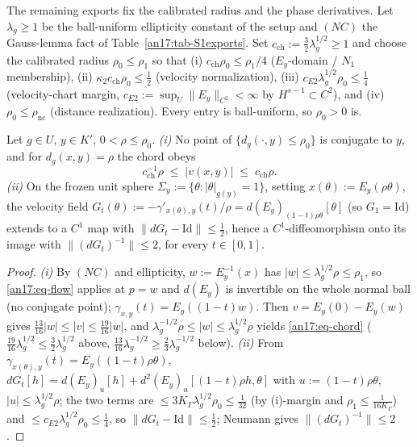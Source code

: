 The remaining exports fix the calibrated radius and the phase derivatives. Let
$\lambda_g\ge1$ be the ball-uniform ellipticity constant of the setup and $(NC)$
the Gauss-lemma fact of Table~\ref{an17:tab-S1exports}. Set
$c_{\mathrm{ch}}:=\tfrac32\lambda_g^{1/2}\ge1$ and choose the calibrated radius
$\rho_0\le\rho_1$ so that (i) $c_{\mathrm{ch}}\rho_0\le\rho_1/4$
($E_y$-domain / $N_1$ membership), (ii) $\kappa_2c_{\mathrm{ch}}\rho_0\le\tfrac12$
(velocity normalization), (iii) $c_{E2}\lambda_g^{1/2}\rho_0\le\tfrac14$
(velocity-chart margin, $c_{E2}:=\sup_U\|E_y\|_{C^2}<\infty$ by $H^{s-1}\subset
C^2$), and (iv) $\rho_0\le\rho_{\mathrm{nc}}$ (distance realization). Every entry
is ball-uniform, so $\rho_0>0$ is.

\begin{lemma}
\label{an17:lem-R4}%
\label{an17:R4}%
Let $g\in U$, $y\in K'$, $0<\rho\le\rho_0$. \emph{(i)} No point of
$\{d_g(\cdot,y)\le\rho_0\}$ is conjugate to $y$, and for $d_g(x,y)=\rho$ the
chord obeys
\begin{equation}\label{an17:eq-chord}
 c_{\mathrm{ch}}^{-1}\rho\;\le\;|v(x,y)|\;\le\;c_{\mathrm{ch}}\rho .
\end{equation}
\emph{(ii)} On the frozen unit sphere $\Sigma_y:=\{\theta:|\theta|_{g(y)}=1\}$,
setting $x(\theta):=E_y(\rho\theta)$, the velocity field $G_t(\theta):=-\gamma'_{
x(\theta),y}(t)/\rho=d(E_y)_{(1-t)\rho\theta}[\theta]$ (so $G_1=\mathrm{Id}$)
extends to a $C^1$ map with $\|dG_t-\mathrm{Id}\|\le\tfrac12$, hence a
$C^1$-diffeomorphism onto its image with $\|(dG_t)^{-1}\|\le2$, for every
$t\in[0,1]$.
\end{lemma}
\begin{proof}
\emph{(i)} By $(NC)$ and ellipticity, $w:=E_y^{-1}(x)$ has $|w|\le\lambda_g^{1/2}
\rho\le\rho_1$, so \eqref{an17:eq-flow} applies at $p=w$ and $d(E_y)$ is
invertible on the whole normal ball (no conjugate point); $\gamma_{x,y}(t)=
E_y((1-t)w)$. Then $v=E_y(0)-E_y(w)$ gives $\tfrac{13}{16}|w|\le|v|\le\tfrac{19}
{16}|w|$, and $\lambda_g^{-1/2}\rho\le|w|\le\lambda_g^{1/2}\rho$ yields
\eqref{an17:eq-chord} ($\tfrac{19}{16}\lambda_g^{1/2}\le\tfrac32\lambda_g^{1/2}$
above, $\tfrac{13}{16}\lambda_g^{-1/2}\ge\tfrac23\lambda_g^{-1/2}$ below).
\emph{(ii)} From $\gamma_{x(\theta),y}(t)=E_y((1-t)\rho\theta)$,
$dG_t[h]=d(E_y)_u[h]+d^2(E_y)_u[(1-t)\rho h,\theta]$ with $u:=(1-t)\rho\theta$,
$|u|\le\lambda_g^{1/2}\rho$; the two terms are $\le3K_\Gamma\lambda_g^{1/2}\rho_0
\le\tfrac1{32}$ (by (i)-margin and $\rho_1\le\tfrac1{16K_\Gamma}$) and
$\le c_{E2}\lambda_g^{1/2}\rho_0\le\tfrac14$, so $\|dG_t-\mathrm{Id}\|\le\tfrac12$;
Neumann gives $\|(dG_t)^{-1}\|\le2$.
\end{proof}

